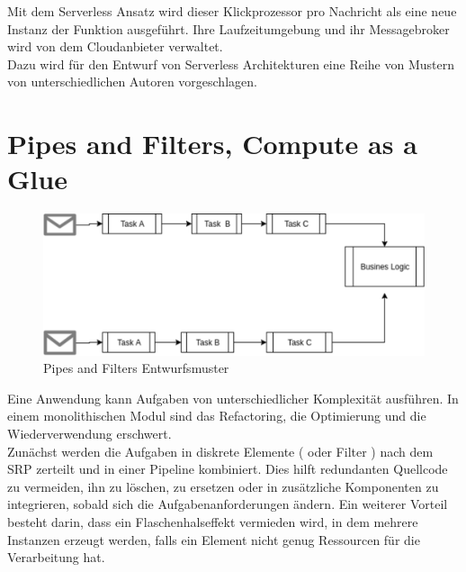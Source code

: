 \documentclass[
12pt,
english,
ngerman,
headsepline,
twoside,
openright,
numbers=noenddot,version=first
]{scrreprt}
\begin{document}
Mit dem Serverless Ansatz wird dieser Klickprozessor pro Nachricht als eine neue Instanz der Funktion ausgeführt. Ihre Laufzeitumgebung und ihr Messagebroker wird von dem Cloudanbieter verwaltet. \cite{fowlerBlogServerless}\\
 

Dazu wird für den Entwurf von Serverless Architekturen eine Reihe von Mustern von unterschiedlichen Autoren vorgeschlagen.\\


\section{Pipes and Filters, Compute as a Glue}
\label{sec:pipes-filters}
\begin{figure}[H]
	\centering
	\includegraphics[scale=0.60]{./pics/pipes-and-filters.eps}
	\caption{Pipes and Filters Entwurfsmuster}
	\label{pic:pipes-and-filters}
\end{figure}
Eine Anwendung kann Aufgaben von unterschiedlicher Komplexität ausführen. In einem monolithischen Modul sind das Refactoring, die Optimierung und die Wiederverwendung erschwert. \\
Zunächst werden die Aufgaben in diskrete Elemente ( oder Filter ) nach dem \acrshort{SRP} zerteilt und in einer Pipeline kombiniert. Dies hilft redundanten Quellcode zu vermeiden, ihn zu löschen, zu ersetzen oder in zusätzliche Komponenten zu integrieren, sobald sich die Aufgabenanforderungen ändern\cite{patternsCloud}. Ein weiterer Vorteil besteht darin, dass ein Flaschenhalseffekt vermieden wird, in dem mehrere Instanzen erzeugt werden, falls ein Element nicht genug Ressourcen für die Verarbeitung hat. 
\end{document}
